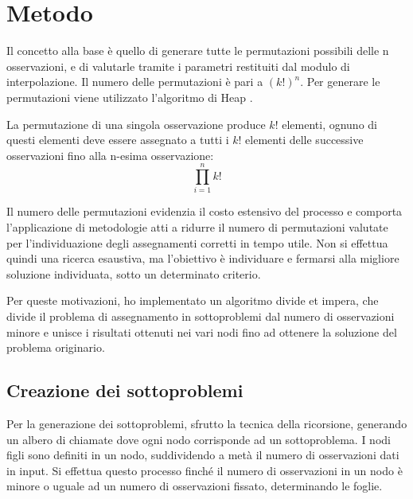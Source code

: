 \documentclass[a4paper,12pt]{report}
\begin{document}
\section{Metodo}
\label{s:struttura}
Il concetto alla base è quello di generare tutte le permutazioni possibili delle n osservazioni, e di valutarle tramite i parametri restituiti dal modulo di interpolazione. Il numero delle permutazioni è pari a $(k!)^{n}$.
Per generare le permutazioni viene utilizzato l'algoritmo di Heap \cite{heap}.

La permutazione di una singola osservazione produce $k!$ elementi, ognuno di questi elementi deve essere assegnato a tutti i $k!$ elementi delle successive osservazioni fino alla n-esima osservazione:
\begin{equation}
 \label{numPerm}
  \prod_{i=1}^{n}k!
\end{equation}

Il numero delle permutazioni evidenzia il costo estensivo del processo e comporta l'applicazione di metodologie atti a ridurre il numero di permutazioni valutate per l'individuazione degli assegnamenti corretti in tempo utile. Non si effettua quindi una ricerca esaustiva, ma l'obiettivo è individuare e fermarsi alla migliore soluzione individuata, sotto un determinato criterio.

Per queste motivazioni, ho implementato un algoritmo divide et impera, che divide il problema di assegnamento in sottoproblemi dal numero di osservazioni minore e unisce i risultati ottenuti nei vari nodi fino ad ottenere la soluzione del problema originario.

\subsection{Creazione dei sottoproblemi}

  Per la generazione dei sottoproblemi, sfrutto la tecnica della ricorsione, generando un albero di chiamate dove ogni nodo corrisponde ad un sottoproblema.
  I nodi figli sono definiti in un nodo, suddividendo a metà il numero di osservazioni dati in input. Si effettua questo processo finché il numero di osservazioni in un nodo è minore o uguale ad un numero di osservazioni fissato, determinando le foglie.
\end{document}
